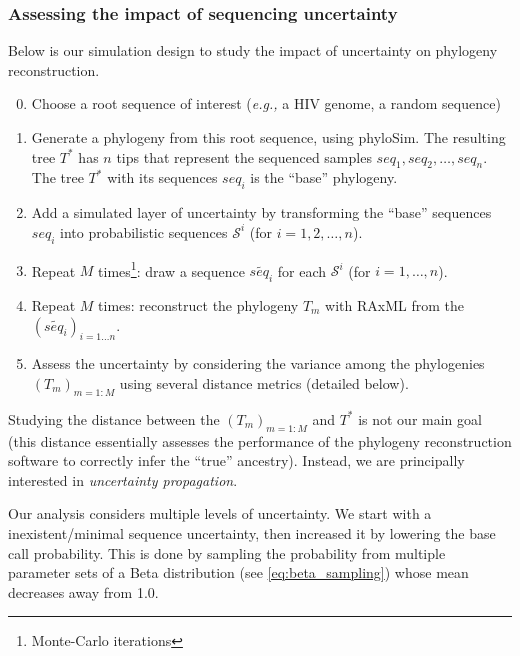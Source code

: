 \documentclass[10pt]{article}
\newcommand{\eg}{\textit{e.g.,}\xspace}
\newcommand{\nps}{\mathcal{S}} %
\begin{document}
\subsubsection{Assessing the impact of sequencing uncertainty}


Below is our simulation design to study the impact of uncertainty on phylogeny reconstruction.

\begin{enumerate}
\setcounter{enumi}{-1} 

\item Choose a root sequence of interest (\eg a HIV genome, a random sequence)

\item Generate a phylogeny from this root sequence, using \textsf{phyloSim}. The resulting tree $T^*$ has $n$ tips that represent the sequenced samples $seq_1, seq_2,\ldots, seq_n$. The tree $T^*$ with its sequences $seq_i$ is the ``base'' phylogeny.

\item Add a simulated layer of uncertainty by transforming the ``base'' sequences $seq_i$ into probabilistic sequences $\nps^i$ (for $i=1,2,\ldots,n$).

\item Repeat $M$ times\footnote{Monte-Carlo iterations}: 
draw a sequence $\widetilde{seq_i}$ for each $\nps^i$ (for $i=1,\ldots, n$).

\item Repeat $M$ times: reconstruct the phylogeny $T_m$ with \textsf{RAxML} from the $(\widetilde{seq_i})_{i=1\ldots n}$. 

\item \label{item:assess} Assess the uncertainty by considering the variance among the phylogenies $(T_m)_{m=1:M}$ using several distance metrics (detailed below).
\end{enumerate}

\noindent Studying the distance between the $(T_m)_{m=1:M}$ and $T^*$ is not our main goal (this distance essentially assesses the performance of the phylogeny reconstruction software to correctly infer the ``true'' ancestry).
Instead, we are principally interested in \emph{uncertainty propagation}.

Our analysis considers multiple levels of uncertainty. We start with a inexistent/minimal sequence uncertainty, then increased it by lowering the base call probability. This is done by sampling the probability from multiple parameter sets of a Beta distribution (see \autoref{eq:beta_sampling}) whose mean decreases away from 1.0. 
\end{document}
